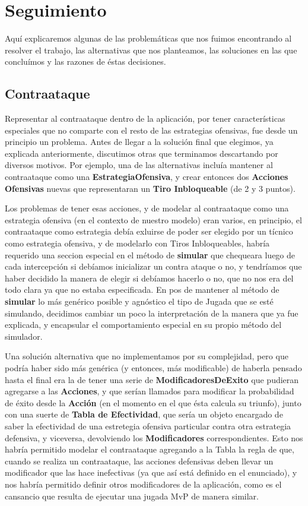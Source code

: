 \section{Seguimiento}

Aquí explicaremos algunas de las problemáticas que nos fuimos encontrando al resolver el trabajo, las alternativas que nos planteamos, las soluciones en las que concluímos y las razones de éstas decisiones.

\subsection{Contraataque}

Representar al contraataque dentro de la aplicación, por tener características especiales que no comparte con el resto de las estrategias ofensivas, fue desde un principio un problema. Antes de llegar a la solución final que elegimos, ya explicada anteriormente, discutimos otras que terminamos descartando por diversos motivos. Por ejemplo, una de las alternativas incluía mantener al contraataque como una \textbf{EstrategiaOfensiva}, y crear entonces dos \textbf{Acciones Ofensivas} nuevas que representaran un \textbf{Tiro Inbloqueable} (de 2 y 3 puntos). 

Los problemas de tener esas acciones, y de modelar al contraataque como una estrategia ofensiva (en el contexto de nuestro modelo) eran varios, en principio, el contraataque como estrategia debía exluirse de poder ser elegido por un tícnico como estrategia ofensiva, y de modelarlo con Tiros Inbloqueables, habría requerido una seccion especial en el método de \textbf{simular} que chequeara luego de cada intercepción si debíamos inicializar un contra ataque o no, y tendríamos que haber decidido la manera de elegir si debíamos hacerlo o no, que no nos era del todo clara ya que no estaba especificada. En pos de mantener al método de \textbf{simular} lo más genérico posible y agnóstico el tipo de Jugada que se esté simulando, decidimos cambiar un poco la interpretación de la manera que ya fue explicada, y encapsular el comportamiento especial en su propio método del simulador.

Una solución alternativa que no implementamos por su complejidad, pero que podría haber sido más genérica (y entonces, más modificable) de haberla pensado hasta el final era la de tener una serie de \textbf{ModificadoresDeExito} que pudieran agregarse a las \textbf{Acciones}, y que serían llamados para modificar la probabilidad de éxito desde la \textbf{Acción} (en el momento en el que ésta calcula su triunfo), junto con una suerte de \textbf{Tabla de Efectividad}, que sería un objeto encargado de saber la efectividad de una estretegia ofensiva particular contra otra estrategia defensiva, y viceversa, devolviendo los \textbf{Modificadores} correspondientes. Esto nos habría permitido modelar el contraataque agregando a la Tabla la regla de que, cuando se realiza un contraataque, las acciones defensivas deben llevar un modificador que las hace inefectivas (ya que así está definido en el enunciado), y nos habría permitido definir otros modificadores de la aplicación, como es el cansancio que resulta de ejecutar una jugada MvP de manera similar.

